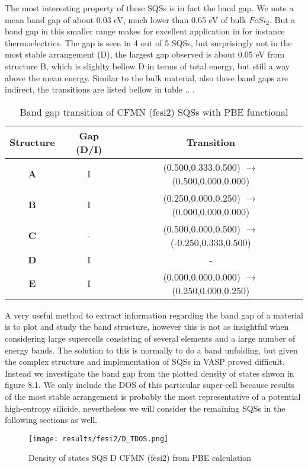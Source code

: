 The most interesting property of these SQSs is in fact the band gap. We note a mean band gap of about 0.03 eV, much lower than 0.65 eV of bulk $FeSi_2$. But a band gap in this smaller range makes for  excellent application in for instance thermoelectrics. The gap is seen in 4 out of 5 SQSs, but surprisingly not in the most stable arrangement (D), the largest gap observed is about 0.05 eV from structure B, which is slighlty bellow D in terms of total energy, but still a way above the mean energy. Similar to the bulk material, also these band gaps are indirect, the transitions are listed bellow in table .. .     

\begin{table}[H]
\centering
\begin{tabular}{@{}ccc@{}}
\toprule
Structure  & Gap (D/I) & Transition                              \\ \midrule
\textbf{A} & I         & (0.500,0.333,0.500) $\rightarrow$ (0.500,0.000,0.000)  \\
\textbf{B} & I         & (0.250,0.000,0.250) $\rightarrow$ (0.000,0.000,0.000)  \\
\textbf{C} & -         & (0.500,0.000,0.500) $\rightarrow$ (-0.250,0.333,0.500) \\
\textbf{D} & I         & -                                        \\
\textbf{E} & I         & (0.000,0.000,0.000) $\rightarrow$ (0.250,0.000,0.250)  \\ \bottomrule
\end{tabular}
\caption{Band gap transition of CFMN (fesi2) SQSs with PBE functional}
\end{table}

A very useful method to extract information regarding the band gap of a material is to plot and study the band structure, however this is not as insightful when considering large supercells consisting of several elements and a  large number of energy bands. The solution to this is normally to do a band unfolding, but given the complex structure and implementation of SQSs in VASP proved difficult. Instead we investigate the band gap from the plotted density of states shwon in figure 8.1. We only include the DOS of this particular super-cell because results of the most stable arrangement is probably the most representative of a potential high-entropy silicide, nevertheless we will consider the remaining SQSs in the following sections as well.  

\begin{figure}[H]
	\centering
	\texttt{[image: results/fesi2/D\_TDOS.png]}
	\caption{Density of states SQS D CFMN (fesi2) from PBE calculation}
\end{figure}

